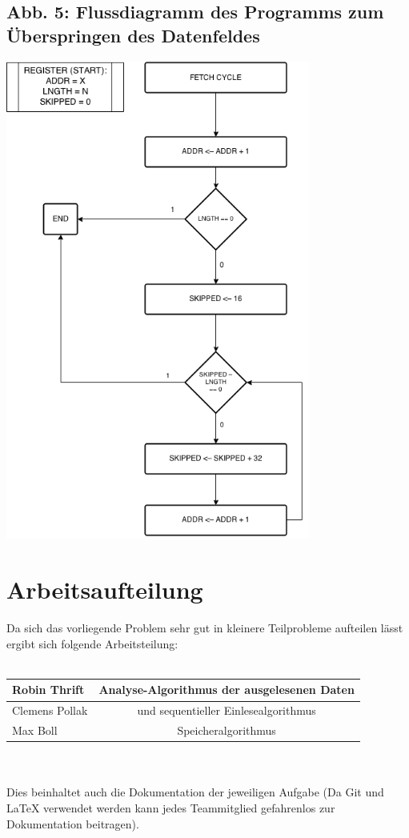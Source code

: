 \documentclass[12pt,titlepage]{article}
\begin{document}
\subsection{Abb. 5: Flussdiagramm des Programms zum Überspringen des Datenfeldes}
\includegraphics[width=10cm]{skipBits.png}

\newpage

\section{Arbeitsaufteilung}
Da sich das vorliegende Problem sehr gut in kleinere Teilprobleme aufteilen lässt ergibt sich folgende 
Arbeitsteilung:
\leavevmode \\
\\
\begin{tabular}{|l|c|}
\hline
Robin Thrift &  Analyse-Algorithmus der ausgelesenen Daten \\
\hline
Clemens Pollak & und sequentieller Einlesealgorithmus \\
\hline
Max Boll & Speicheralgorithmus \\
\hline
\end{tabular}
\leavevmode \\
\\
Dies beinhaltet auch die Dokumentation der jeweiligen Aufgabe (Da Git und LaTeX verwendet werden kann jedes 
Teammitglied gefahrenlos zur Dokumentation beitragen).
\end{document}

